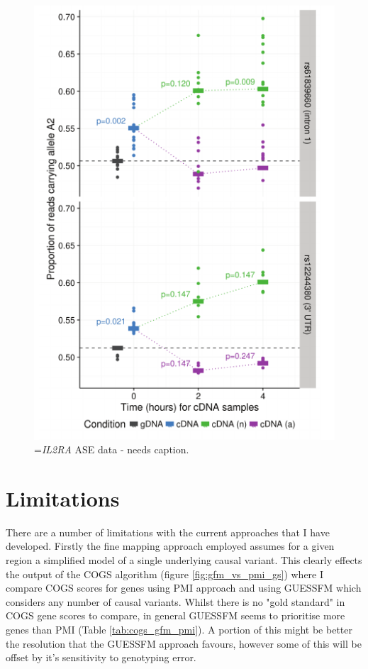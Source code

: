 \documentclass[a4paper,11pt]{report}
\begin{document}
\begin{figure}[h]
\includegraphics[width=\textwidth]{il2ra_ase_tc.pdf}
\caption{=\textit{IL2RA} ASE data - needs caption.}
\label{fig:il2ra_ase_tc}
\end{figure}

\section{Limitations}
There are a number of limitations with the current approaches that I have developed. Firstly the fine mapping approach employed assumes for a given region a simplified model of a single underlying causal variant. This clearly effects the output of the COGS algorithm (figure \ref{fig:gfm_vs_pmi_gs}) where I compare COGS scores for genes using PMI approach and using GUESSFM which considers any number of causal variants. Whilst there is no "gold standard"  in COGS gene scores to compare, in general GUESSFM seems to prioritise more genes than PMI (Table \ref{tab:cogs_gfm_pmi}). A portion of this might be better the resolution that the GUESSFM approach favours, however some of this will be offset by it's sensitivity to genotyping error. 
\end{document}
